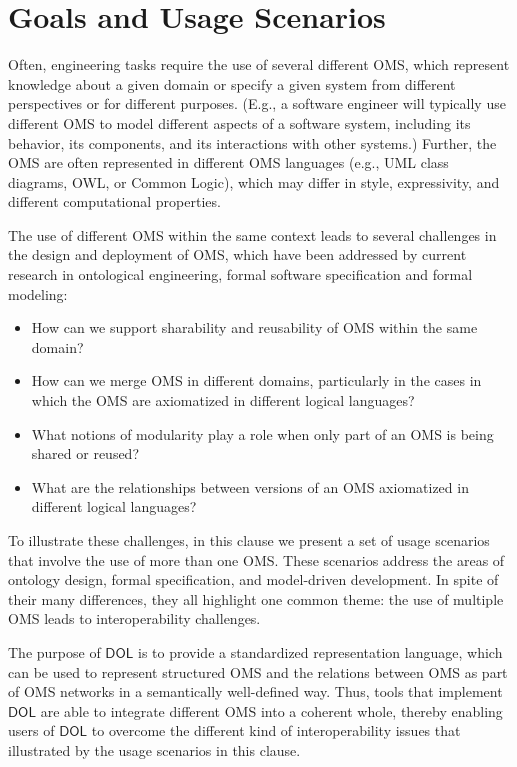 \documentclass[10pt,fleqn,%
\ifpretendfinal
final%
\else
draft%
\fi,
]{scrreprt}
\newcommand*{\DOL}{\ensuremath{\mathsf{DOL}}\xspace}
\begin{document}

\chapter{Goals and Usage Scenarios} \label{c:goal}


Often, engineering tasks require the use of several different OMS, which represent knowledge about 
a given domain or specify a given system from different perspectives or for different purposes.
(E.g., a software engineer will typically use different OMS to model different aspects of a software
 system,  including its behavior, its components, and its interactions with other systems.)  Further, the OMS are often represented in different OMS languages (e.g., UML class diagrams, OWL, or Common Logic), which may differ in style, expressivity, and different computational properties. 

The use of different OMS within the same context leads to  several 
challenges in the design and deployment of OMS, which have been addressed by current research in 
ontological engineering, formal software specification and formal modeling:
\begin{itemize}
\item How can we support sharability and reusability of OMS within the same domain?
\item How can we merge OMS in different domains, particularly in the cases 
in which the OMS are axiomatized in different logical languages?
\item What notions of modularity play a role when only part of an OMS is being shared or reused?
\item What are the relationships between versions of an OMS axiomatized in different logical languages?
\end{itemize}


To illustrate these challenges, in this clause we present a set of usage scenarios that involve the use of more than one OMS. These scenarios address the areas of ontology design, formal specification, and model-driven development. In spite of their many differences, they  all highlight one common theme:  
 the use of multiple OMS leads to interoperability challenges. 


The purpose of \DOL is to provide  a
standardized representation language, which can be used to represent structured OMS and the relations 
between OMS as part of OMS networks in a semantically well-defined way. Thus, tools that implement \DOL are able to integrate different OMS into a coherent whole, thereby enabling users of \DOL to overcome the different kind of interoperability issues that illustrated by the usage scenarios in this clause.  
\end{document}

